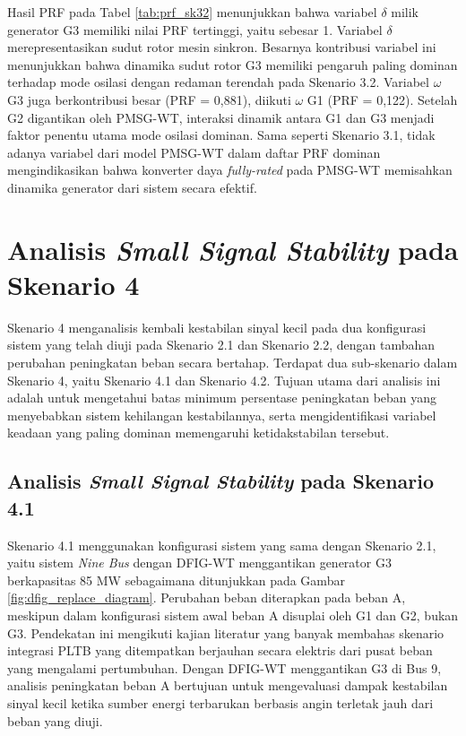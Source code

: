 Hasil PRF pada Tabel \ref{tab:prf_sk32} menunjukkan bahwa variabel $\delta$
milik generator G3 memiliki nilai PRF tertinggi, yaitu sebesar 1. Variabel
$\delta$ merepresentasikan sudut rotor mesin sinkron. Besarnya kontribusi
variabel ini menunjukkan bahwa dinamika sudut rotor G3 memiliki pengaruh paling
dominan terhadap mode osilasi dengan redaman terendah pada Skenario 3.2.
Variabel $\omega$ G3 juga berkontribusi besar (PRF = 0,881), diikuti $\omega$ G1
(PRF = 0,122). Setelah G2 digantikan oleh PMSG-WT, interaksi dinamik antara G1
dan G3 menjadi faktor penentu utama mode osilasi dominan. Sama seperti Skenario 3.1, tidak adanya
variabel dari model PMSG-WT dalam daftar PRF dominan mengindikasikan bahwa
konverter daya \textit{fully-rated} pada PMSG-WT memisahkan dinamika generator
dari sistem secara efektif.

\section{Analisis \textit{Small Signal Stability} pada Skenario 4}

Skenario 4 menganalisis kembali kestabilan sinyal kecil pada dua konfigurasi
sistem yang telah diuji pada Skenario 2.1 dan Skenario 2.2, dengan tambahan
perubahan peningkatan beban secara bertahap. Terdapat dua sub-skenario dalam
Skenario 4, yaitu Skenario 4.1 dan Skenario 4.2. Tujuan utama dari analisis ini
adalah untuk mengetahui batas minimum persentase peningkatan beban yang
menyebabkan sistem kehilangan kestabilannya, serta mengidentifikasi variabel
keadaan yang paling dominan memengaruhi ketidakstabilan tersebut.

\subsection{Analisis \textit{Small Signal Stability} pada Skenario 4.1}

Skenario 4.1 menggunakan konfigurasi sistem yang sama dengan Skenario 2.1, yaitu
sistem \textit{Nine Bus} dengan DFIG-WT menggantikan generator G3 berkapasitas
85 MW sebagaimana ditunjukkan pada Gambar \ref{fig:dfig_replace_diagram}.
Perubahan beban diterapkan pada beban A, meskipun dalam konfigurasi sistem awal
beban A disuplai oleh G1 dan G2, bukan G3. Pendekatan ini mengikuti kajian
literatur yang banyak membahas skenario integrasi PLTB yang ditempatkan berjauhan
secara elektris dari pusat beban yang mengalami pertumbuhan. Dengan DFIG-WT
menggantikan G3 di Bus 9, analisis peningkatan beban A bertujuan untuk mengevaluasi
dampak kestabilan sinyal kecil ketika sumber energi terbarukan berbasis angin
terletak jauh dari beban yang diuji.



